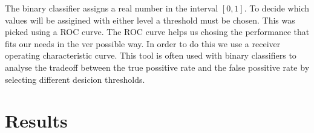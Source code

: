 The binary classifier assigns a real number in the interval $[0,1]$. To decide which values will be assigined with either level a threshold must be chosen. This was picked using a ROC curve. The ROC curve helps us chosing the performance that fits our needs in the ver possible way. In order to do this we use a receiver operating characteristic curve. This tool is often used with binary classifiers to analyse the tradeoff between the true possitive rate and the false possitive rate by selecting different desicion thresholds.

\begin{figure}[h]
  \begin{center}
  \end{center}
\end{figure}



\section{Results}
